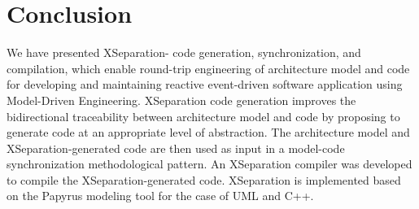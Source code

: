 \section{Conclusion}
\label{sec:conclusion}
We have presented XSeparation- code generation, synchronization, and compilation, which enable round-trip engineering of architecture model and code for developing and maintaining reactive event-driven software application using Model-Driven Engineering.
XSeparation code generation improves the bidirectional traceability between architecture model and code by proposing to generate code at an appropriate level of abstraction. 
The architecture model and XSeparation-generated code are then used as input in a model-code synchronization methodological pattern.
An XSeparation compiler was developed to compile the XSeparation-generated code.
XSeparation is implemented based on the Papyrus modeling tool for the case of UML and C++. 
 




